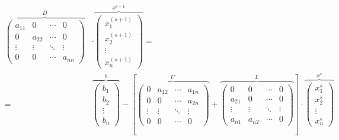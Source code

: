 \begin{align*}
\overbrace{\begin{pmatrix}
a_{11}& 0& \cdots & 0\\
0& a_{22}& \cdots & 0\\
\vdots & \vdots & \ddots & \vdots\\
0& 0& \cdots & a_{nn}
\end{pmatrix}}^D &\cdot \overbrace{\begin{pmatrix}
x_1^{(s+1)}\\
x_2^{(s+1)}\\
\vdots \\
x_n^{(s+1)}
\end{pmatrix}}^{x^{s+1}}=&\\
=&\overbrace{\begin{pmatrix}
b_1\\
b_2\\
\vdots \\
b_n
\end{pmatrix}}^b-\left[
\overbrace{\begin{pmatrix}
0& a_{12}& \cdots & a_{1n}\\
0& 0& \cdots & a_{2n}\\
\vdots & \vdots & \ddots & \vdots\\
0& 0& \cdots & 0
\end{pmatrix}}^U+
\overbrace{\begin{pmatrix}
0& 0& \cdots & 0\\
a_{21}& 0& \cdots & 0\\
\vdots & \vdots & \ddots & \vdots\\
a_{n1}& a_{n2}& \cdots & 0
\end{pmatrix}}^L \right] \cdot \overbrace{\begin{pmatrix}
x_1^s\\
x_2^s\\
\vdots \\
x_n^s
\end{pmatrix}}^{x^s}
\end{align*}

